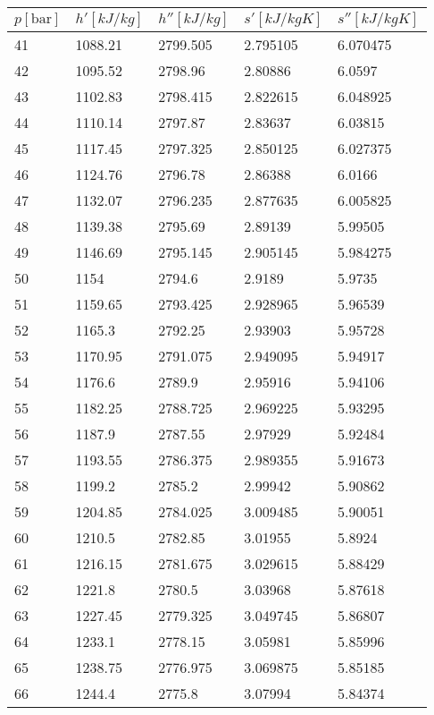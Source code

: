 \documentclass[twocolumn]{article}
\begin{document}
\begin{tabular}{l|l|l|l|l}
	$p [\text{bar}] $ & $h' [kJ/kg]$ & $h'' [kJ/kg]$ & $s' [kJ/kg K] $ & $s'' [kJ/kg K]$ \\ \hline
41	&	1088.21	&	2799.505	&	2.795105	&	6.070475 \\ \hline
42	&	1095.52	&	2798.96	&	2.80886	&	6.0597 \\ \hline
43	&	1102.83	&	2798.415	&	2.822615	&	6.048925 \\ \hline
44	&	1110.14	&	2797.87	&	2.83637	&	6.03815 \\ \hline
45	&	1117.45	&	2797.325	&	2.850125	&	6.027375 \\ \hline
46	&	1124.76	&	2796.78	&	2.86388	&	6.0166 \\ \hline
47	&	1132.07	&	2796.235	&	2.877635	&	6.005825 \\ \hline
48	&	1139.38	&	2795.69	&	2.89139	&	5.99505 \\ \hline
49	&	1146.69	&	2795.145	&	2.905145	&	5.984275 \\ \hline
50	&	1154	&	2794.6	&	2.9189	&	5.9735 \\ \hline
51	&	1159.65	&	2793.425	&	2.928965	&	5.96539 \\ \hline
52	&	1165.3	&	2792.25	&	2.93903	&	5.95728 \\ \hline
53	&	1170.95	&	2791.075	&	2.949095	&	5.94917 \\ \hline
54	&	1176.6	&	2789.9	&	2.95916	&	5.94106 \\ \hline
55	&	1182.25	&	2788.725	&	2.969225	&	5.93295 \\ \hline
56	&	1187.9	&	2787.55	&	2.97929	&	5.92484 \\ \hline
57	&	1193.55	&	2786.375	&	2.989355	&	5.91673 \\ \hline
58	&	1199.2	&	2785.2	&	2.99942	&	5.90862 \\ \hline
59	&	1204.85	&	2784.025	&	3.009485	&	5.90051 \\ \hline
60	&	1210.5	&	2782.85	&	3.01955	&	5.8924 \\ \hline
61	&	1216.15	&	2781.675	&	3.029615	&	5.88429 \\ \hline
62	&	1221.8	&	2780.5	&	3.03968	&	5.87618 \\ \hline
63	&	1227.45	&	2779.325	&	3.049745	&	5.86807 \\ \hline
64	&	1233.1	&	2778.15	&	3.05981	&	5.85996 \\ \hline
65	&	1238.75	&	2776.975	&	3.069875	&	5.85185 \\ \hline
66	&	1244.4	&	2775.8	&	3.07994	&	5.84374 \\ \hline

\end{tabular}
\end{document}
